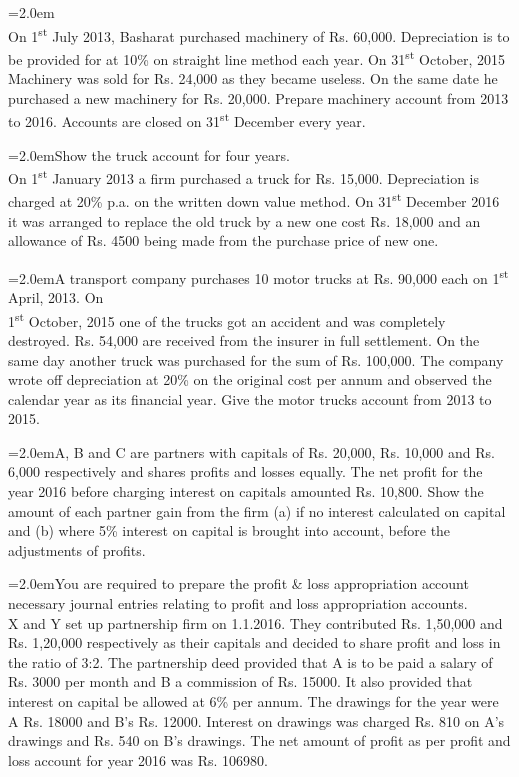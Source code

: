 \documentclass[11pt,a4paper]{article}
\newcommand{\lqn}[2]{\Needspace{6\baselineskip}\par\medskip\noindent\hangindent=2.0em\hangafter=1\makebox[2.0em][l]{\textbf{#1.}}#2\par}
\begin{document}
\lqn{73}{\\
On 1\textsuperscript{st}  July 2013, Basharat purchased machinery of Rs. 60,000. Depreciation is to be provided for at 10\% on straight line method each year. On 31\textsuperscript{st}  October, 2015 Machinery was sold for Rs. 24,000 as they became useless. On the same date he purchased a new machinery for Rs. 20,000. Prepare machinery account from 2013 to 2016. Accounts are closed on 31\textsuperscript{st}  December every year.\par
}
\lqn{74}{Show the truck account for four years.\\
On 1\textsuperscript{st}  January 2013 a firm purchased a truck for Rs. 15,000. Depreciation is charged at 20\% p.a. on the written down value method. On 31\textsuperscript{st}  December 2016 it was arranged to replace the old truck by a new one cost Rs. 18,000 and an allowance of Rs. 4500 being made from the purchase price of new one.\par
}
\lqn{75}{A transport company purchases 10 motor trucks at Rs. 90,000 each on 1\textsuperscript{st}  April, 2013. On\\
1\textsuperscript{st}  October, 2015 one of the trucks got an accident and was completely destroyed. Rs. 54,000 are received from the insurer in full settlement. On the same day another truck was purchased for the sum of Rs. 100,000. The company wrote off depreciation at 20\% on the original cost per annum and observed the calendar year as its financial year. Give the motor trucks account from 2013 to 2015.\par
}
\lqn{76}{A, B and C are partners with capitals of Rs. 20,000, Rs. 10,000 and Rs. 6,000 respectively and shares profits and losses equally. The net profit for the year 2016 before charging interest on capitals amounted Rs. 10,800. Show the amount of each partner gain from the firm (a) if no interest calculated on capital and (b) where 5\% interest on capital is brought into account, before the adjustments of profits.\par
}
\lqn{77}{You are required to prepare the profit \& loss appropriation account necessary journal entries relating to profit and loss appropriation accounts.\\
X and Y set up partnership firm on 1.1.2016. They contributed Rs. 1,50,000 and Rs. 1,20,000 respectively as their capitals and decided to share profit and loss in the ratio of 3:2. The partnership deed provided that A is to be paid a salary of Rs. 3000 per month and B a commission of Rs. 15000. It also provided that interest on capital be allowed at 6\% per annum. The drawings for the year were A Rs. 18000 and B’s Rs. 12000. Interest on drawings was charged Rs. 810 on A’s drawings and Rs. 540 on B’s drawings. The net amount of profit as per profit and loss account for year 2016 was Rs. 106980.\par
}
\end{document}
